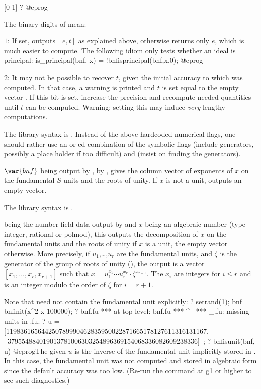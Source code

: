 [0 1]
? %
@eprog

\noindent The binary digits of \fl mean:

\item $1$: If set, outputs $[e,t]$ as explained above, otherwise returns
only $e$, which is much easier to compute. The following idiom only tests
whether an ideal is principal:
\bprog
  is_principal(bnf, x) = !bnfisprincipal(bnf,x,0);
@eprog

\item $2$: It may not be possible to recover $t$, given the initial accuracy
to which  was computed. In that case, a warning is printed and $t$ is
set equal to the empty vector \kbd{[]\til}. If this bit is set,
increase the precision and recompute needed quantities until $t$ can be
computed. Warning: setting this may induce \emph{very} lengthy computations.

The library syntax is .
Instead of the above hardcoded numerical flags, one should
rather use an or-ed combination of the symbolic flags  (include
generators, possibly a place holder if too difficult) and 
(insist on finding the generators).

\label{se:bnfissunit}
$\var{bnf}$ being output by
,  by , gives the column vector of
exponents of $x$ on the fundamental $S$-units and the roots of unity.
If $x$ is not a unit, outputs an empty vector.

The library syntax is .

\label{se:bnfisunit}
 being the number field data
output by  and $x$ being an algebraic number (type integer,
rational or polmod), this outputs the decomposition of $x$ on the fundamental
units and the roots of unity if $x$ is a unit, the empty vector otherwise.
More precisely, if $u_1$,\dots,$u_r$ are the fundamental units, and $\zeta$
is the generator of the group of roots of unity (), the output is
a vector $[x_1,\dots,x_r,x_{r+1}]$ such that $x=u_1^{x_1}\cdots
u_r^{x_r}\cdot\zeta^{x_{r+1}}$. The $x_i$ are integers for $i\le r$ and is an
integer modulo the order of $\zeta$ for $i=r+1$.

Note that  need not contain the fundamental unit explicitly:
\bprog
? setrand(1); bnf = bnfinit(x^2-x-100000);
? bnf.fu
  ***   at top-level: bnf.fu
  ***                     ^--
  *** _.fu: missing units in .fu.
? u = [119836165644250789990462835950022871665178127611316131167, \
       379554884019013781006303254896369154068336082609238336]~;
? bnfisunit(bnf, u)
@eprog\noindent The given $u$ is the inverse of the fundamental unit
implicitly stored in \var{bnf}. In this case, the fundamental unit was not
computed and stored in algebraic form since the default accuracy was too
low. (Re-run the command at \bs g1 or higher to see such diagnostics.)

